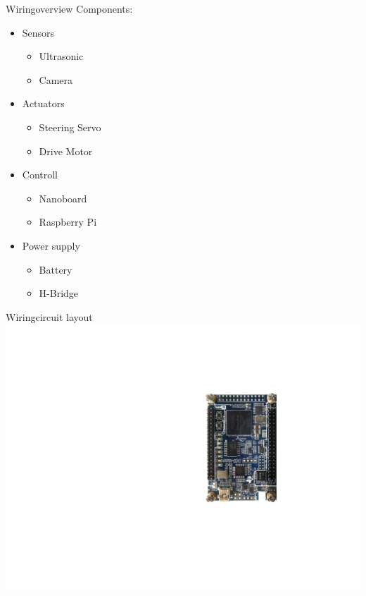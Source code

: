  
\begin{frame}[plain]{Wiring}{overview}
	Components:
	\center
	\pause
	\begin{itemize}
		\item Sensors
		\begin{itemize}
			\item Ultrasonic
			\item Camera
		\end{itemize}
		\pause
		\item Actuators
		\begin{itemize}
			\item Steering Servo
			\item Drive Motor
		\end{itemize}
		\pause
		\item Controll
		\begin{itemize}
			\item Nanoboard
			\item Raspberry Pi
		\end{itemize}
		\pause
		\item Power supply
		\begin{itemize}
			\item Battery
			\item H-Bridge
		\end{itemize}
	\end{itemize}
	
\end{frame}
 
 
 \begin{frame}[plain]{Wiring}{circuit layout}
	\includegraphics[width=\textwidth]{Feathergraphics/wiring1}
	\end{frame}
	
	
\setcounter{ctra}{2}
%
{%
\begin{frame}[plain,noframenumbering]{Wiring}{circuit layout}
	\texttt{[image: Feathergraphics/wiring\\the\\value\{ctra]}}

\end{frame}
}
\addtocounter{page}{-16}